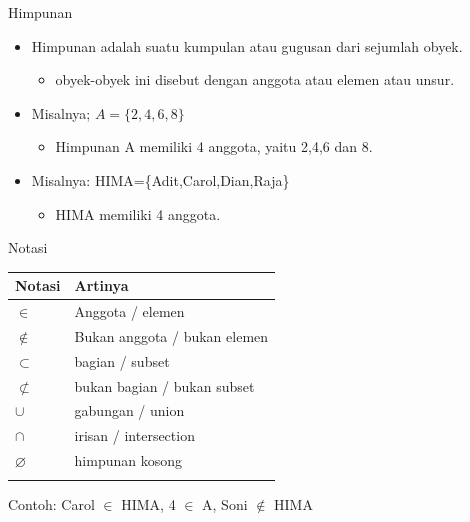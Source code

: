 \documentclass[
  ignorenonframetext,
]{beamer}
\providecommand{\tightlist}{%
  \setlength{\itemsep}{0pt}\setlength{\parskip}{0pt}}\usepackage{longtable,booktabs,array}
\begin{document}
\begin{frame}{Himpunan}
\label{himpunan}
\begin{itemize}
\item
  Himpunan adalah suatu kumpulan atau gugusan dari sejumlah obyek.

  \begin{itemize}
  \tightlist
  \item
    obyek-obyek ini disebut dengan anggota atau elemen atau unsur.
  \end{itemize}
\item
  Misalnya; \(A=\{2,4,6,8\}\)

  \begin{itemize}
  \tightlist
  \item
    Himpunan A memiliki 4 anggota, yaitu 2,4,6 dan 8.
  \end{itemize}
\item
  Misalnya: HIMA=\{Adit,Carol,Dian,Raja\}

  \begin{itemize}
  \tightlist
  \item
    HIMA memiliki 4 anggota.
  \end{itemize}
\end{itemize}
\end{frame}

\begin{frame}{Notasi}
\label{notasi}
\begin{longtable}[]{@{}ll@{}}
\toprule\noalign{}
Notasi & Artinya \\
\midrule\noalign{}
\endhead
\(\in\) & Anggota / elemen \\
\(\not \in\) & Bukan anggota / bukan elemen \\
\(\subset\) & bagian / subset \\
\(\not \subset\) & bukan bagian / bukan subset \\
\(\cup\) & gabungan / union \\
\(\cap\) & irisan / intersection \\
\(\varnothing\) & himpunan kosong \\
\bottomrule\noalign{}
\end{longtable}

Contoh: Carol \(\in\) HIMA, 4 \(\in\) A, Soni \(\not \in\) HIMA
\end{frame}
\end{document}
